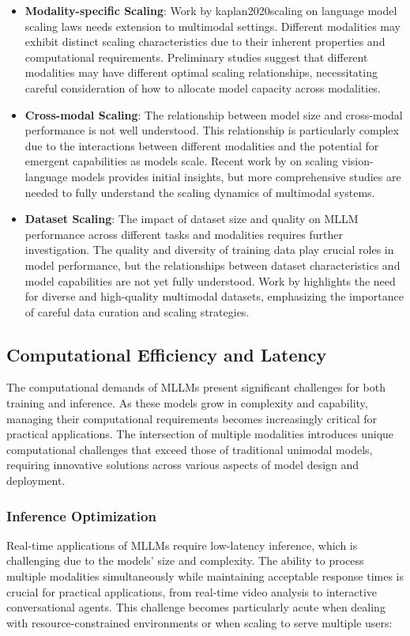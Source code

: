 \begin{itemize}
    \item \textbf{Modality-specific Scaling}: Work by kaplan2020scaling on language model scaling laws needs extension to multimodal settings. Different modalities may exhibit distinct scaling characteristics due to their inherent properties and computational requirements. Preliminary studies suggest that different modalities may have different optimal scaling relationships, necessitating careful consideration of how to allocate model capacity across modalities.
    
    \item \textbf{Cross-modal Scaling}: The relationship between model size and cross-modal performance is not well understood. This relationship is particularly complex due to the interactions between different modalities and the potential for emergent capabilities as models scale. Recent work by on scaling vision-language models provides initial insights, but more comprehensive studies are needed to fully understand the scaling dynamics of multimodal systems.
    
    \item \textbf{Dataset Scaling}: The impact of dataset size and quality on MLLM performance across different tasks and modalities requires further investigation. The quality and diversity of training data play crucial roles in model performance, but the relationships between dataset characteristics and model capabilities are not yet fully understood. Work by highlights the need for diverse and high-quality multimodal datasets, emphasizing the importance of careful data curation and scaling strategies.
\end{itemize}


\subsection{Computational Efficiency and Latency}
The computational demands of MLLMs present significant challenges for both training and inference. As these models grow in complexity and capability, managing their computational requirements becomes increasingly critical for practical applications. The intersection of multiple modalities introduces unique computational challenges that exceed those of traditional unimodal models, requiring innovative solutions across various aspects of model design and deployment.

\subsubsection{Inference Optimization}
Real-time applications of MLLMs require low-latency inference, which is challenging due to the models' size and complexity. The ability to process multiple modalities simultaneously while maintaining acceptable response times is crucial for practical applications, from real-time video analysis to interactive conversational agents. This challenge becomes particularly acute when dealing with resource-constrained environments or when scaling to serve multiple users:

